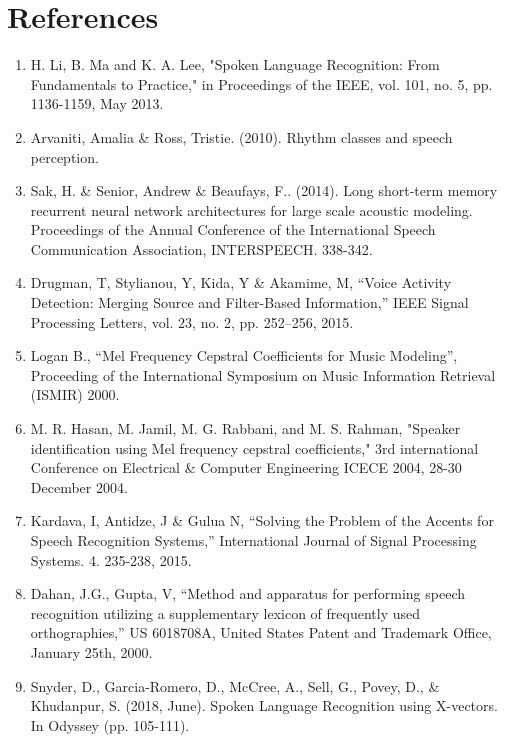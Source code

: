 \documentclass{llncs}
\begin{document}
\section{References}
\begin{enumerate}
\item H. Li, B. Ma and K. A. Lee, "Spoken Language Recognition: From Fundamentals to Practice," in Proceedings of the IEEE, vol. 101, no. 5, pp. 1136-1159, May 2013.

\item Arvaniti, Amalia \& Ross, Tristie. (2010). Rhythm classes and speech perception.

\item Sak, H. \& Senior, Andrew \& Beaufays, F.. (2014). Long short-term memory recurrent neural network architectures for large scale acoustic modeling. Proceedings of the Annual Conference of the International Speech Communication Association, INTERSPEECH. 338-342.

\item Drugman, T, Stylianou, Y, Kida, Y \& Akamime, M, “Voice Activity Detection: Merging Source and Filter-Based Information,” IEEE Signal Processing Letters, vol. 23, no. 2, pp. 252–256, 2015.

\item Logan B., “Mel Frequency Cepstral Coefficients for Music Modeling”, Proceeding of the International Symposium on Music Information Retrieval (ISMIR) 2000.

\item M. R. Hasan, M. Jamil, M. G. Rabbani, and M. S. Rahman, "Speaker identification using Mel frequency cepstral coefficients," 3rd international Conference on Electrical \& Computer Engineering ICECE 2004, 28-30 December 2004.

\item Kardava, I, Antidze, J \& Gulua N, “Solving the Problem of the Accents for Speech Recognition Systems,” International Journal of Signal Processing Systems. 4. 235-238, 2015.

\item Dahan, J.G., Gupta, V, “Method and apparatus for performing speech recognition utilizing a supplementary lexicon of frequently used orthographies,” US 6018708A, United States Patent and Trademark Office, January 25th, 2000.
\item Snyder, D., Garcia-Romero, D., McCree, A., Sell, G., Povey, D., \& Khudanpur, S. (2018, June). Spoken Language Recognition using X-vectors. In Odyssey (pp. 105-111).


\end{enumerate}
\end{document}
